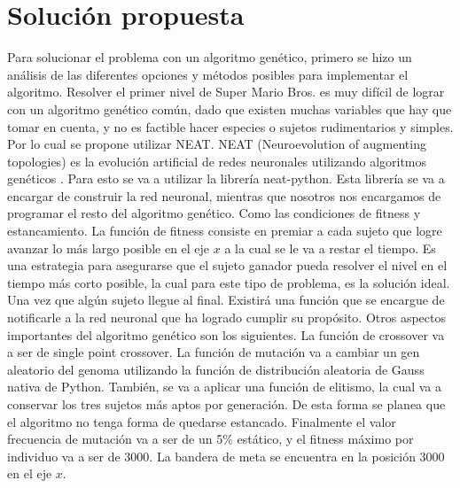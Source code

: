 \documentclass{article}
\begin{document}
\begin{itemize}
\end{itemize}

\section{Solución propuesta}
Para solucionar el problema con un algoritmo genético, primero se hizo un análisis de las diferentes opciones y métodos posibles para implementar el algoritmo. Resolver el primer nivel de Super Mario Bros\@. es muy difícil de lograr con un algoritmo genético común, dado que existen muchas variables que hay que tomar en cuenta, y no es factible hacer especies o sujetos rudimentarios y simples. Por lo cual se propone utilizar NEAT. NEAT (Neuroevolution of augmenting topologies) es la evolución artificial de redes neuronales utilizando algoritmos genéticos \textcite{neat2002}. Para esto se va a utilizar la librería neat-python. Esta librería se va a encargar de construir la red neuronal, mientras que nosotros nos encargamos de programar el resto del algoritmo genético. Como las condiciones de fitness y estancamiento. La función de fitness consiste en premiar a cada sujeto que logre avanzar lo más largo posible en el eje \(x\) a la cual se le va a restar el tiempo. Es una estrategia para asegurarse que el sujeto ganador pueda resolver el nivel en el tiempo más corto posible, la cual para este tipo de problema, es la solución ideal. Una vez que algún sujeto llegue al final. Existirá una función que se encargue de notificarle a la red neuronal que ha logrado cumplir su propósito. Otros aspectos importantes del algoritmo genético son los siguientes. La función de crossover va a ser de single point crossover. La función de mutación va a cambiar un gen aleatorio del genoma utilizando la función de distribución aleatoria de Gauss nativa de Python. También, se va a aplicar una función de elitismo, la cual va a conservar los tres sujetos más aptos por generación. De esta forma se planea que el algoritmo no tenga forma de quedarse estancado. Finalmente el valor frecuencia de mutación va a ser de un 5\% estático, y el fitness máximo por individuo va a ser de 3000. La bandera de meta se encuentra en la posición 3000 en el eje \(x\).
\end{document}
